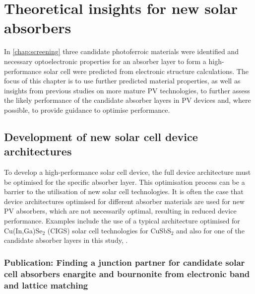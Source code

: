 \documentclass[11pt, twoside]{report}
\begin{document}
\chapter{Theoretical insights for new solar absorbers}\label{chap:insights}

In \autoref{chap:screening} three candidate photoferroic materials were identified and necessary optoelectronic properties for an absorber layer to form a high-performance solar cell were predicted from electronic structure calculations. The focus of this chapter is to use further predicted material properties, as well as insights from previous studies on more mature PV technologies, to further assess the likely performance of the candidate absorber layers in PV devices and, where possible, to provide guidance to optimise performance.


\section{Development of new solar cell device architectures}
To develop a high-performance solar cell device, the full device architecture must be optimised for the specific absorber layer. This optimisation process can be a barrier to the utilisation of new solar cell technologies. It is often the case that device architectures optimised for different absorber materials are used for new PV absorbers, which are not necessarily optimal, resulting in reduced device performance. Examples include the use of a typical architecture optimised for Cu(In,Ga)Se$_2$ (CIGS) solar cell technologies for CuSbS$_2$ \cite{CAS_alignment} and also for one of the candidate absorber layers in this study, {\enargite} \cite{enargite_SC}.


\subsection{Publication: Finding a junction partner for candidate solar cell absorbers enargite and bournonite from electronic band and lattice matching}\label{sulfosalt_band_alignment}
\end{document}

